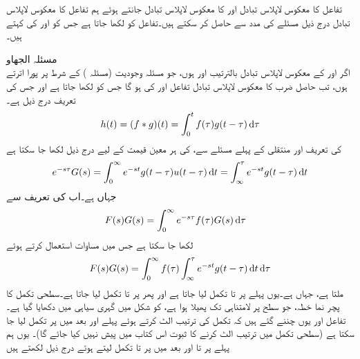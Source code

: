 تفاعل  کا معکوس لاپلاس تبادل  اور  کا معکوس لاپلاس تبادل  جانتے ہوئے ہم تفاعل  کا معکوس لاپلاس تبادل  درج ذیل مسئلے کی مدد سے حاصل کر سکتے ہیں۔تفاعل  کو  لکھا جاتا ہے جس کو  اور  کی  کہتے ہیں۔

\quad مسئلہ الجھاو\\
اگر  اور  کے معکوس لاپلاس تبادل بالترتیب  اور  ہوں، جو مسئلہ وجودیت (مسئلہ ) کے شرط پر پورا اترتے ہوں، تب حاصل ضرب  کا معکوس لاپلاس تبادل  تفاعل  اور  کی  ہو گا جس کو  لکھا جاتا ہے اور جس کی تعریف درج ذیل ہے۔
\begin{align}\label{مساوات_لاپلاس_الجھاو_تعریف}
h(t)=(f*g)(t)=\int_{0}^{t}f(\tau)g(t-\tau)\dif \tau
\end{align}
 کی تعریف اور منتقلی کے پہلے مسئلے  سے،  کی ہر معین قیمت کے لیے درج ذیل لکھا جا سکتا ہے
\begin{align}\label{مساوات_لاپلاس_الجھاو_الف}
e^{-s\tau}G(s)=\int_{0}^{\infty}e^{-st}g(t-\tau)u(t-\tau)\dif t=\int_{\infty}^{\tau} e^{-st}g(t-\tau)\dif t
\end{align}
جہاں  ہے۔اب  کی تعریف سے
\begin{align*}
F(s)G(s)&=\int_{0}^{\infty}e^{-s\tau}f(\tau)G(s)\dif \tau
\end{align*}
لکھا جا سکتا ہے جس میں مساوات  استعمال کرتے ہوئے
\begin{align*}
F(s)G(s)=\int_{0}^{\infty} f(\tau)\int_{\infty}^{\tau} e^{-st}g(t-\tau)\dif t \dif \tau
\end{align*}
ملتا ہے، جہاں  ہے۔یوں پہلے  پر  تا  تکمل لیا جاتا ہے اور پھر  پر  تا  تکمل لیا جاتا ہے۔سطحی تکمل کا پچر نما خطہ، جو  سطح پر لامتناہی تک پھیلا ہوا ہے، کو شکل  میں گہری سیاہی میں دکھایا گیا ہے۔ تفاعل   اور  یوں چننے گئے ہیں کہ تکمل کی ترتیب الٹ کرتے ہوئے پہلے  اور بعد میں  پر تکمل لیا جا سکتا ہے (سطحی تکمل میں ترتیب الٹ کرنے کا ثبوت اس کتاب میں پیش نہیں کیا جائے گا)۔ یوں ہم پہلے  پر  تا  اور بعد میں  پر  تا  تکمل لیتے ہوئے درج ذیل لکھتے ہیں
